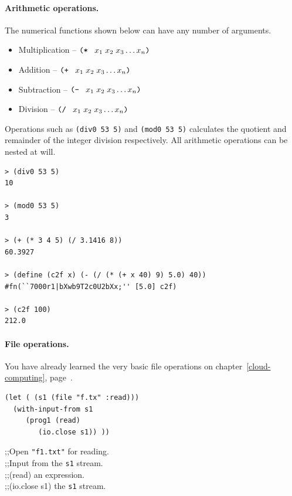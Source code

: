 \documentclass[a4paper,12pt]{book}
\newenvironment{fmpage}[1]
               {\begin{lrbox}{\fmbox}\begin{minipage}{#1}}
               {\end{minipage}\end{lrbox}\fbox{\usebox{\fmbox}}}
\begin{document}
\paragraph{Arithmetic operations.} The numerical functions
shown below can have any number of arguments.
\begin{itemize}
\item Multiplication -- $\verb|(* |\;x_1\; x_2\; x_3\ldots x_n\verb|)|$
\item Addition -- $\verb|(+ |\;x_1\; x_2\; x_3\ldots x_n\verb|)|$
\item Subtraction -- $\verb|(- |\;x_1\; x_2\; x_3\ldots x_n\verb|)|$
\item Division -- $\verb|(/ |\;x_1\; x_2\; x_3\ldots x_n\verb|)|$
\end{itemize}
Operations such as \verb|(div0 53 5)| and \verb|(mod0 53 5)|
calculates the quotient and remainder of the integer
division respectively. All arithmetic operations can
be nested at will.
\begin{Verbatim}[fontsize=\small,
    frame=single]
> (div0 53 5)
10

> (mod0 53 5)
3

> (+ (* 3 4 5) (/ 3.1416 8))
60.3927

> (define (c2f x) (- (/ (* (+ x 40) 9) 5.0) 40))
#fn(``7000r1|bXwb9T2c0U2bXx;'' [5.0] c2f)

> (c2f 100)
212.0
\end{Verbatim}

\paragraph{File operations.}
You have already learned the very basic
file operations on chapter~\ref{cloud-computing},
page~\pageref{cloud-computing}.\\


\begin{fmpage}{0.5\textwidth}
\begin{verbatim}
(let ( (s1 (file "f.tx" :read)))
  (with-input-from s1
     (prog1 (read)
        (io.close s1)) ))
\end{verbatim}
\end{fmpage}
\begin{fmpage}{0.4\textwidth}\small
  ;;Open \verb|"f1.txt"| for reading.\\
  ;;Input from the \verb|s1| stream.\\
  ;;(read) an expression.\\
  ;;(io.close s1) the \verb|s1| stream.
\end{fmpage}
\end{document}
